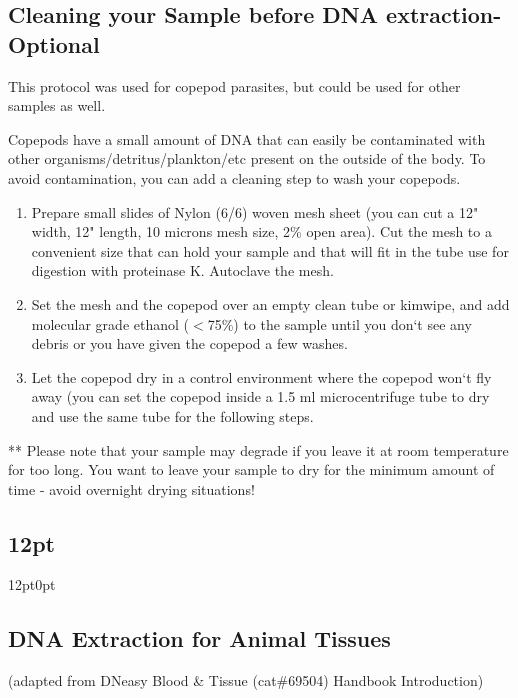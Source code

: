 \documentclass[11pt, oneside]{article}
\begin{document}
	\newpage

\subsection{Cleaning your Sample before DNA extraction- Optional}
This protocol was used for copepod parasites, but could be used for other samples as well.

		\noindent Copepods have a small amount of DNA that can easily be contaminated with other organisms/detritus/plankton/etc present on the 			outside of the body. To avoid contamination, you can add a cleaning step to wash your copepods.

		\begin{enumerate}[leftmargin=.5in]
			\item Prepare small slides of Nylon (6/6) woven mesh sheet (you can cut a 12" width, 12" length, 10 microns mesh size, 2\% open area). Cut 			the mesh to a convenient size that can hold your sample and that will fit in the tube use for digestion with proteinase K. Autoclave the mesh.
			\item Set the mesh and the copepod over an empty clean tube or kimwipe, and add molecular grade ethanol ($<$75\%) to the sample until 			you don`t see any debris or you have given the copepod a few washes. 
			\item Let the copepod dry in a control environment where the copepod won`t fly away (you can set the copepod inside a 1.5 ml 					microcentrifuge tube to dry and use the same tube for the following steps.
		\end{enumerate}

		** Please note that your sample may degrade if you leave it at room temperature for too long. You want to leave your sample to dry for the 			minimum amount of time - avoid overnight drying situations! 

	\newpage

	\titlespacing\subsection{12pt}{12pt}{0pt}
	\subsection{DNA Extraction for Animal Tissues}
		(adapted from DNeasy Blood \& Tissue (cat\#69504) Handbook Introduction)

		\vspace{5mm}
		
\end{document}
